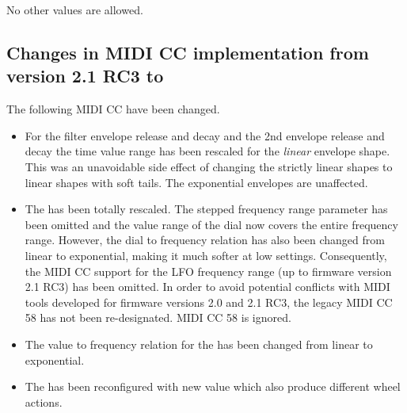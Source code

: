 No other values are allowed.

\subsection*{Changes in MIDI CC implementation from version 2.1 RC3 to \version}

The following MIDI CC have been changed.

\begin{itemize}
  \item For the filter envelope release and decay and the 2nd envelope release and decay the time value range has been rescaled for the \textit{linear} envelope shape. This was an unavoidable side effect of changing the strictly linear shapes to linear shapes with soft tails. The exponential envelopes are unaffected.
  \item The \lfofreq has been totally rescaled. The stepped frequency range parameter has been omitted and the value range of the \lfofreq dial now covers the entire frequency range. However, the dial to frequency relation has also been changed from linear to exponential, making it much softer at low settings. Consequently, the MIDI CC support for the LFO frequency range (up to firmware version 2.1 RC3) has been omitted. In order to avoid potential conflicts with MIDI tools developed for firmware versions 2.0 and 2.1 RC3, the legacy MIDI CC 58 has not been re-designated. MIDI CC 58 is ignored.
  \item The value to frequency relation for the \vibspeed has been changed from linear to exponential.   
  \item The \modwheelrange has been reconfigured with new value which also produce different wheel actions.
\end{itemize}


\normalsize
